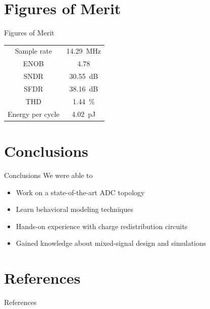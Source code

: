\documentclass{beamer}
\begin{document}
 \section{Figures of Merit}
 \begin{frame}{Figures of Merit}
  \centering
  \begin{tabular}[]{cc}
   \toprule
   Sample rate & \SI{14.29}{\MHz}\\
   ENOB & \num{4.78}\\
   SNDR & \SI{30.55}{dB}\\
   SFDR & \SI{38.16}{dB}\\
   THD & \SI{1.44}{\percent}\\
   Energy per cycle & \SI{4.02}{\pico\joule}\\\bottomrule
  \end{tabular}
 \end{frame}
 \section{Conclusions}
 \begin{frame}{Conclusions}
  We were able to
  \begin{itemize}
   \item Work on a state-of-the-art ADC topology
   \item<2-> Learn behavioral modeling techniques
   \item<3-> Hands-on experience with charge redistribution circuits
   \item<4-> Gained knowledge about mixed-signal design and simulations
  \end{itemize}
 \end{frame}

 \section{References}
 \begin{frame}{References}
  \nocite{*}
  
  
 \end{frame}
\end{document}
